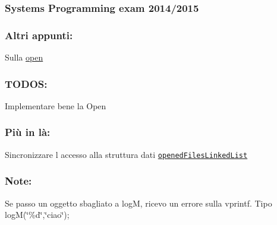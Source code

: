 \subsubsection*{Systems Programming exam 2014/2015}

\subsubsection*{Altri appunti\+:}


\begin{DoxyItemize}
\item Sulla \hyperlink{md_OPE}{open}
\end{DoxyItemize}

\subsubsection*{T\+O\+D\+O\+S\+:}


\begin{DoxyItemize}
\item Implementare bene la Open
\end{DoxyItemize}

\subsubsection*{Più in là\+:}


\begin{DoxyItemize}
\item Sincronizzare l\textquotesingle{} accesso alla struttura dati \href{file:///home/federicoponzi/Progetto/html/server_8c.html#a3063a74baee4fe1870e52d0ec577afa9}{\tt opened\+Files\+Linked\+List}
\end{DoxyItemize}

\subsubsection*{Note\+:}


\begin{DoxyItemize}
\item Se passo un oggetto sbagliato a log\+M, ricevo un errore sulla vprintf. Tipo log\+M(\char`\"{}\%d\char`\"{},\char`\"{}ciao\char`\"{}); 
\end{DoxyItemize}
